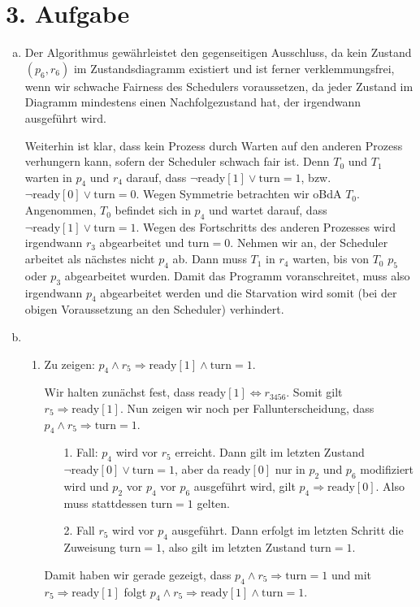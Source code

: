 \documentclass[numbers=noendperiod]{scrartcl}
\begin{document}
\section*{3. Aufgabe}

\begin{enumerate}[a)]
	\item Der Algorithmus gewährleistet den gegenseitigen Ausschluss, da kein Zustand $(p_6,r_6)$ im Zustandsdiagramm existiert und ist ferner verklemmungsfrei, wenn wir schwache Fairness des Schedulers voraussetzen, da jeder Zustand im Diagramm mindestens einen Nachfolgezustand hat, der irgendwann ausgeführt wird.
	
	Weiterhin ist klar, dass kein Prozess durch Warten auf den anderen Prozess verhungern kann, sofern der Scheduler schwach fair ist. Denn $T_0$ und $T_1$ warten in $p_4$ und $r_4$ darauf, dass $\lnot \text{ready}[1] \lor \text{turn} = 1$, bzw. $\lnot \text{ready}[0] \lor \text{turn} = 0$. Wegen Symmetrie betrachten wir oBdA $T_0$. Angenommen, $T_0$ befindet sich in $p_4$ und wartet darauf, dass $\lnot \text{ready}[1] \lor \text{turn} = 1$. Wegen des Fortschritts des anderen Prozesses wird irgendwann $r_3$ abgearbeitet und $\text{turn} = 0$. Nehmen wir an, der Scheduler arbeitet als nächstes nicht $p_4$ ab.  Dann muss $T_1$ in $r_4$ warten, bis von $T_0$ $p_5$ oder $p_3$ abgearbeitet wurden. Damit das Programm voranschreitet, muss also irgendwann $p_4$ abgearbeitet werden und die Starvation wird somit (bei der obigen Voraussetzung an den Scheduler) verhindert.
	
	\item \begin{enumerate}[(1.)]
		\item Zu zeigen: $p_4 \land r_5 \Rightarrow \text{ready}[1] \land \text{turn} = 1$.
		
		Wir halten zunächst fest, dass $\text{ready}[1] \Leftrightarrow r_{3456}$. Somit gilt $r_5 \Rightarrow \text{ready}[1]$. Nun zeigen wir noch per Fallunterscheidung, dass $p_4 \land r_5 \Rightarrow \text{turn} = 1$.
		\begin{enumerate}
			\item[1. Fall:] $p_4$ wird vor $r_5$ erreicht. Dann gilt im letzten Zustand $\lnot \text{ready}[0] \lor \text{turn} = 1$, aber da $\text{ready}[0]$ nur in $p_2$ und $p_6$ modifiziert wird und $p_2$ vor $p_4$ vor $p_6$ ausgeführt wird, gilt $p_4 \Rightarrow \text{ready}[0]$. Also muss stattdessen $\text{turn} = 1 $ gelten.
			\item[2. Fall] $r_5$ wird vor $p_4$ ausgeführt. Dann erfolgt im letzten Schritt die Zuweisung $\text{turn} = 1$, also gilt im letzten Zustand $\text{turn} = 1$.
		\end{enumerate}
		Damit haben wir gerade gezeigt, dass $p_4 \land r_5 \Rightarrow \text{turn} = 1$ und mit $r_5 \Rightarrow \text{ready}[1]$ folgt $p_4 \land r_5 \Rightarrow \text{ready}[1] \land \text{turn} = 1$.
		

\end{enumerate}
\end{enumerate}
\end{document}
